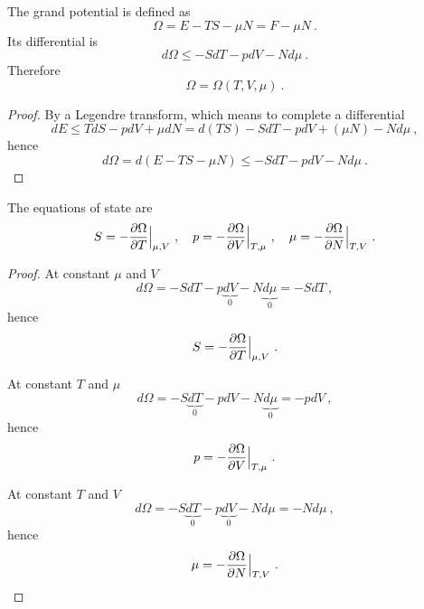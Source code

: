     The grand potential is defined as 
    \begin{equation}\label{td:o}
        \Omega = E - TS - \mu N = F - \mu N ~.
    \end{equation}
    Its differential is 
    \begin{equation}\label{td:d:o}
        d\Omega \leq - SdT - pdV - N d\mu ~.
    \end{equation}
    Therefore
    \begin{equation*}
        \Omega = \Omega(T, V, \mu) ~.
    \end{equation*}
    \begin{proof}
        By a Legendre transform, which means to complete a differential
        \begin{equation*}
            dE \leq T dS - p dV + \mu dN = d(TS) - SdT - p dV + (\mu N) - N d\mu ~,
        \end{equation*}
        hence 
        \begin{equation*}
            d\Omega = d(E - TS - \mu N) \leq - SdT - p dV - N d\mu ~.
        \end{equation*}
    \end{proof}

    The equations of state are
    \begin{equation}\label{td:es:o}
        S = - \frac{\partial\Omega}{\partial T} \Big \vert_{\mu,V} ~, \quad p = - \frac{\partial\Omega}{\partial V} \Big \vert_{T,\mu} ~, \quad \mu = - \frac{\partial\Omega}{\partial N} \Big \vert_{T,V} ~. 
    \end{equation}
    \begin{proof}
        At constant $\mu$ and $V$
        \begin{equation*}
            d\Omega = - SdT - p\underbrace{dV}_0 - N \underbrace{d\mu}_0 = - S dT ~,
        \end{equation*}
        hence 
        \begin{equation*}
            S = - \frac{\partial\Omega}{\partial T} \Big \vert_{\mu,V} ~.
        \end{equation*}

        At constant $T$ and $\mu$
        \begin{equation*}
            d\Omega = - S \underbrace{dT}_0 - pdV - N \underbrace{d\mu}_ 0 = - p dV ~,
        \end{equation*}
        hence 
        \begin{equation*}
            p = - \frac{\partial\Omega}{\partial V} \Big \vert_{T,\mu} ~.
        \end{equation*}

        At constant $T$ and $V$
        \begin{equation*}
            d\Omega = - S\underbrace{dT}_0 - p\underbrace{dV}_0 - N d\mu = - N d\mu~,
        \end{equation*}
        hence 
        \begin{equation*}
            \mu = - \frac{\partial\Omega}{\partial N} \Big \vert_{T,V} ~.
        \end{equation*}
    \end{proof}

